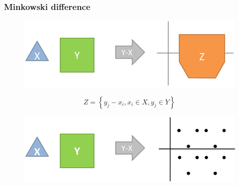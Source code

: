 \documentclass{beamer}
\begin{document}
\begin{frame}
  \frametitle{Minkowski difference}

  \begin{figure}[p]
    \centering
    \includegraphics[width=0.7\linewidth]{minkowski}
  \end{figure}
  \vspace{-1em}
   {
  $$
  Z = \left\{ y_j - x_i, x_i \in X, y_j \in Y \right\}
  $$
  }
  \vspace{-2em}
   {

  \begin{figure}[p]
    \centering
    \includegraphics[width=0.7\linewidth]{minkowskidetail}
  \end{figure}
  }

\end{frame}
\end{document}
